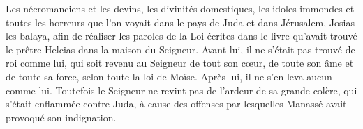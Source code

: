 Les nécromanciens et les devins, les divinités domestiques, les idoles immondes
	et toutes les horreurs que l’on voyait dans le pays de Juda et dans Jérusalem,
	Josias les balaya, afin de réaliser les paroles de la Loi
	écrites dans le livre qu’avait trouvé le prêtre Helcias dans la maison du Seigneur.
Avant lui, il ne s’était pas trouvé de roi comme lui,
	qui soit revenu au Seigneur de tout son cœur, de toute son âme et de toute sa force,
	selon toute la loi de Moïse.
Après lui, il ne s’en leva aucun comme lui.
Toutefois le Seigneur ne revint pas de l’ardeur de sa grande colère,
		qui s’était enflammée contre Juda,
	à cause des offenses par lesquelles Manassé avait provoqué son indignation.
